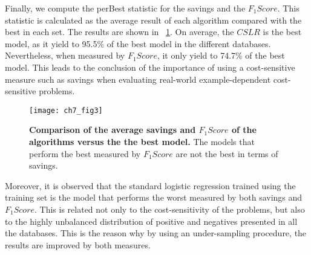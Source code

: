 Finally, we compute the perBest statistic  for the savings and the $F_1Score$. This statistic is 
calculated as the average result of each algorithm compared with the best in each set. The results 
are shown in \figurename{~\ref{fig:7:comparison_per_best}}. On average, the $CSLR$ is the best 
model, as it yield to 95.5\% of the best model in the different databases. Nevertheless, when 
measured by $F_1Score$, it only yield to 74.7\% of the best model. This leads to the conclusion 
of the importance of using a cost-sensitive measure such as savings when evaluating real-world 
example-dependent cost-sensitive problems. 

\begin{figure} 
  \centering
  \texttt{[image: ch7\_fig3]}
  \caption{\textbf{Comparison of the average savings and $F_1Score$ of the algorithms versus the 
    the best model.} The models that perform the best measured by $F_1Score$ are not the best 
  in terms of savings.}
  \label{fig:7:comparison_per_best}
\end{figure}

Moreover, it is observed that the standard logistic regression trained using the training set is 
the model that performs the worst measured by both savings and $F_1Score$. This is related not only 
to the cost-sensitivity of the problems, but also to the highly unbalanced distribution of positive 
and negatives presented in all the databases. This is the reason why by using an under-sampling 
procedure, the results are improved by both measures.